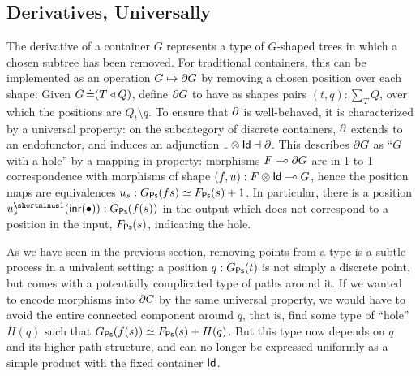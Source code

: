 \subsection{Derivatives, Universally}

The derivative of a container \( G \) represents a type of
\( G \)-shaped trees in which a chosen subtree has been removed.
For traditional containers, this can be implemented as an operation \( G \mapsto \partial{G} \) by removing a chosen position over each shape:
Given \( G \operatorname{\mathrel{\doteq}} (T\mathbin{\triangleleft}Q) \), \citeauthor{AbbottEtAl2005DataDifferentiating} define \( \partial{G} \)
to have as shapes pairs \( (t , q) : \sum_{T} Q \), over which the positions are \( Q_t \setminus q \).
To ensure that \( \partial \) is well-behaved, it is characterized by a universal property:
on the subcategory of discrete containers, \( \partial \) extends to an endofunctor,
and induces an adjunction \( \Maybe{\Blank} \dashv \Der \).
This describes \( \partial{G} \) as \enquote{\( G \) with a hole} by a mapping-in property:
morphisms \( F\mathrel{\multimap}\partial{G} \) are in 1-to-1 correspondence with morphisms of shape \( (f, u) : F \mathbin{\otimes} \mathsf{Id}\mathrel{\multimap}G \),
hence the position maps are equivalences \( u_s : G_{\operatorname{\mathsf{Ps}}}(fs) \simeq F_{\operatorname{\mathsf{Ps}}}(s) + 1 \).
In particular, there is a position \( u_s^{\Inv}(\Inr(\bullet)) : G_{\Ps}(f(s)) \) in the output
which does not correspond to a position in the input, \( F_{\operatorname{\mathsf{Ps}}}(s) \), indicating the hole.

As we have seen in the previous section, removing points from a type is a subtle process in a univalent setting:
a position \( q : G_{\operatorname{\mathsf{Ps}}}(t) \) is not simply a discrete point, but comes with a potentially complicated type of paths around it.
If we wanted to encode morphisms into \( \partial{G} \) by the same universal property,
we would have to avoid the entire connected component around \( q \),
that is, find some type of \enquote{hole} \( H(q) \) such that \( G_{\operatorname{\mathsf{Ps}}}(f(s)) \simeq F_{\operatorname{\mathsf{Ps}}}(s) + H(q) \).
But this type now depends on \( q \) and its higher path structure,
and can no longer be expressed uniformly as a simple product with the fixed container \( \mathsf{Id} \).

